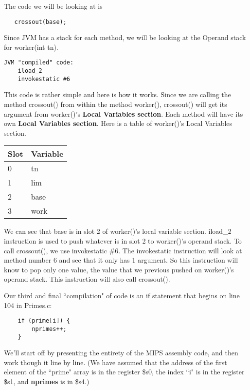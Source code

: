 \documentclass[11pt]{article}
\begin{document}
The code we will be looking at is 
\begin{verbatim}
   crossout(base);
\end{verbatim}

Since JVM has a stack for each method, we will be looking at the Operand stack for worker(int tn).

\begin{verbatim}
JVM "compiled" code:
    iload_2
    invokestatic #6
\end{verbatim}

This code is rather simple and here is how it works. Since we are calling the method crossout() from within the method worker(), crossout() will get its argument from worker()'s {\bf Local Variables section}. Each method will have its own {\bf Local Variables section}. Here is a table of worker()'s Local Variables section.

\begin{table}[h]
    \begin{tabular}{|l|l|}
        \hline
        Slot & Variable \\ \hline
        0    & tn       \\ 
        1    & lim      \\ 
        2    & base     \\ 
        3    & work     \\
        \hline
    \end{tabular}
\end{table}

We can see that base is in slot 2 of worker()'s local variable section. iload\_2 instruction is used to push whatever is in slot 2 to worker()'s operand stack. To call crossout(), we use invokestatic \#6. The invokestatic instruction will look at method number 6 and see that it only has 1 argument. So this instruction will know to pop only one value, the value that we previous pushed on worker()'s operand stack. This instruction will also call crossout().




Our third and final ``compilation" of code is an if statement that begins on line 104 in Primes.c:

\begin{verbatim}
    if (prime[i]) {
        nprimes++;
    }
\end{verbatim}

We'll start off by presenting the entirety of the MIPS assembly code, and then work though it line by line. (We have assumed that the address of the first element of the ``prime" array is in the register \$s0, the index ``i" is in the register \$s1, and \textbf{nprimes} is in \$s4.)
\end{document}
